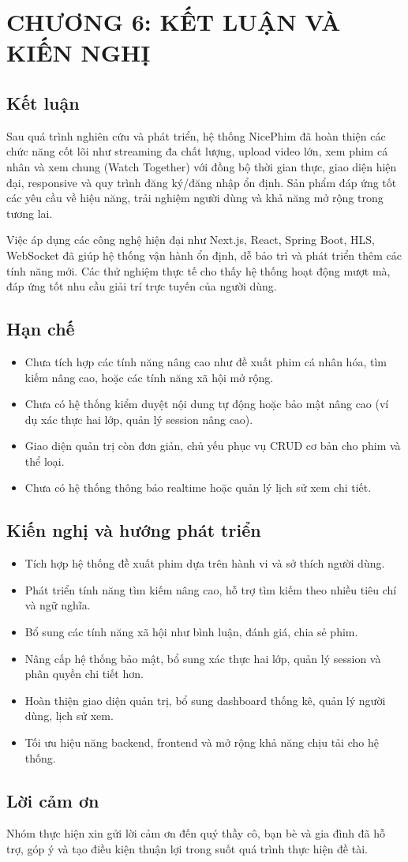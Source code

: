 
\newpage
\section{\textbf{CHƯƠNG 6: KẾT LUẬN VÀ KIẾN NGHỊ}}

\subsection{Kết luận}
Sau quá trình nghiên cứu và phát triển, hệ thống NicePhim đã hoàn thiện các chức năng cốt lõi như streaming đa chất lượng, upload video lớn, xem phim cá nhân và xem chung (Watch Together) với đồng bộ thời gian thực, giao diện hiện đại, responsive và quy trình đăng ký/đăng nhập ổn định. Sản phẩm đáp ứng tốt các yêu cầu về hiệu năng, trải nghiệm người dùng và khả năng mở rộng trong tương lai.

Việc áp dụng các công nghệ hiện đại như Next.js, React, Spring Boot, HLS, WebSocket đã giúp hệ thống vận hành ổn định, dễ bảo trì và phát triển thêm các tính năng mới. Các thử nghiệm thực tế cho thấy hệ thống hoạt động mượt mà, đáp ứng tốt nhu cầu giải trí trực tuyến của người dùng.

\subsection{Hạn chế}
\begin{itemize}
	\item Chưa tích hợp các tính năng nâng cao như đề xuất phim cá nhân hóa, tìm kiếm nâng cao, hoặc các tính năng xã hội mở rộng.
	\item Chưa có hệ thống kiểm duyệt nội dung tự động hoặc bảo mật nâng cao (ví dụ xác thực hai lớp, quản lý session nâng cao).
	\item Giao diện quản trị còn đơn giản, chủ yếu phục vụ CRUD cơ bản cho phim và thể loại.
	\item Chưa có hệ thống thông báo realtime hoặc quản lý lịch sử xem chi tiết.
\end{itemize}

\subsection{Kiến nghị và hướng phát triển}
\begin{itemize}
	\item Tích hợp hệ thống đề xuất phim dựa trên hành vi và sở thích người dùng.
	\item Phát triển tính năng tìm kiếm nâng cao, hỗ trợ tìm kiếm theo nhiều tiêu chí và ngữ nghĩa.
	\item Bổ sung các tính năng xã hội như bình luận, đánh giá, chia sẻ phim.
	\item Nâng cấp hệ thống bảo mật, bổ sung xác thực hai lớp, quản lý session và phân quyền chi tiết hơn.
	\item Hoàn thiện giao diện quản trị, bổ sung dashboard thống kê, quản lý người dùng, lịch sử xem.
	\item Tối ưu hiệu năng backend, frontend và mở rộng khả năng chịu tải cho hệ thống.
\end{itemize}

\subsection{Lời cảm ơn}
Nhóm thực hiện xin gửi lời cảm ơn đến quý thầy cô, bạn bè và gia đình đã hỗ trợ, góp ý và tạo điều kiện thuận lợi trong suốt quá trình thực hiện đề tài.

